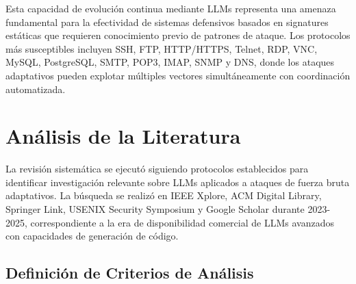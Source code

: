 Esta capacidad de evolución continua mediante LLMs representa una amenaza fundamental para la efectividad de sistemas defensivos basados en signatures estáticas que requieren conocimiento previo de patrones de ataque. Los protocolos más susceptibles incluyen SSH, FTP, HTTP/HTTPS, Telnet, RDP, VNC, MySQL, PostgreSQL, SMTP, POP3, IMAP, SNMP y DNS, donde los ataques adaptativos pueden explotar múltiples vectores simultáneamente con coordinación automatizada.

\section{Análisis de la Literatura}

La revisión sistemática se ejecutó siguiendo protocolos establecidos para identificar investigación relevante sobre LLMs aplicados a ataques de fuerza bruta adaptativos. La búsqueda se realizó en IEEE Xplore, ACM Digital Library, Springer Link, USENIX Security Symposium y Google Scholar durante 2023-2025, correspondiente a la era de disponibilidad comercial de LLMs avanzados con capacidades de generación de código.

\subsection{Definición de Criterios de Análisis}

